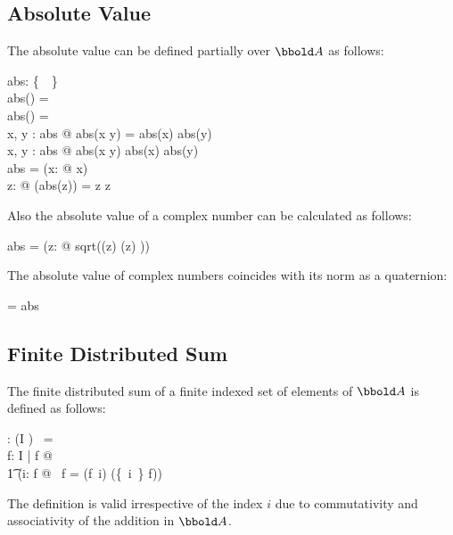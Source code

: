 \documentclass[12pt]{article}
\begin{document}
\subsection{Absolute Value}
\label{sec:abs}
The absolute value can be defined partially over $\arithmos$ as follows:
\begin{axdef}
  abs: \arithmos \pfun \realplus \cup \{~\azero~\}\\
  \where
  abs(\azero) = \azero\\
  abs(\aone) = \aone\\
  \forall x, y : \dom abs @ abs(x \amult y) = abs(x) \amult abs(y)\\
  \forall x, y : \dom abs @ abs(x \aplus y) \aleq abs(x) \aplus
  abs(y)\\
  \real \dres abs = \id \real \oplus (\lambda x: \realminus @ \aneg
  x)\\
  \forall z: \complex @ (abs(z))  = z \amult z\aconj\\
\end{axdef}
%
Also the absolute value of a complex number can be calculated as follows:
\begin{zed}
  \complex \dres abs = (\lambda z: \complex @ sqrt(\Re(z) 
  \aplus \Im(z) ))\\
\end{zed}
% 
The absolute value of complex numbers coincides with its norm as a quaternion:
\begin{zed}
  \complex \dres \norm = abs \\
\end{zed}
%

\subsection{Finite Distributed Sum}
\label{sec:fin-distr-sum}
The finite distributed sum of a finite indexed set of elements of
$\arithmos$ is defined as follows:

\begin{gendef}[I]
    \findistsum : (I \ffun \arithmos) \fun \arithmos
    \where
    \findistsum~\emptyset = \azero \\
    \forall f: I \ffun \arithmos | f \neq \emptyset @ \\
    \t1 (\exists i: \dom f @ \findistsum~f = (f~i) \aplus
    \findistsum(\{~i~\} \ndres f))
\end{gendef}
The definition is valid irrespective of the index $i$ due to
commutativity and associativity of the addition in $\arithmos$. 
\end{document}
